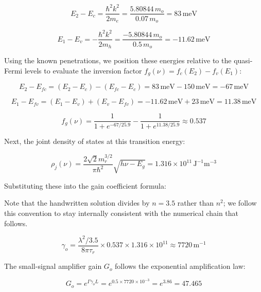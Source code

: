 \begin{equation*}
  E_2 - E_c = \frac{\hbar^2 k^2}{2 m_e} = \frac{5.80844\,m_o}{0.07\,m_o} = 83\,\text{meV}
\end{equation*}

\begin{equation*}
  E_1 - E_v = -\frac{\hbar^2 k^2}{2 m_h} = \frac{-5.80844\,m_o}{0.5\,m_o} = -11.62\,\text{meV}
\end{equation*}

Using the known penetrations, we position these energies relative to the quasi-Fermi levels to evaluate the inversion factor $f_g(\nu) = f_c(E_2) - f_v(E_1)$:

\begin{equation*}
  E_2 - E_{fc} = (E_2 - E_c) - (E_{fc} - E_c) = 83\,\text{meV} - 150\,\text{meV} = -67\,\text{meV}
\end{equation*}

\begin{equation*}
  E_1 - E_{fv} = (E_1 - E_v) + (E_v - E_{fv}) = -11.62\,\text{meV} + 23\,\text{meV} = 11.38\,\text{meV}
\end{equation*}

\begin{equation*}
  f_g(\nu) = \frac{1}{1 + e^{-67/25.9}} - \frac{1}{1 + e^{11.38/25.9}} \approx 0.537
\end{equation*}

Next, the joint density of states at this transition energy:

\begin{equation*}
  \rho_j(\nu) = \frac{2\sqrt{2} m_r^{3/2}}{\pi \hbar^2} \sqrt{h\nu - E_g} = 1.316 \times 10^{11}\,\text{J}^{-1}\text{m}^{-3}
\end{equation*}

Substituting these into the gain coefficient formula:

Note that the handwritten solution divides by $n = 3.5$ rather than $n^2$; we follow this convention to stay internally consistent with the numerical chain that follows.

\begin{equation*}
  \gamma_o = \frac{\lambda^2 / 3.5}{8\pi \tau_r} \times 0.537 \times 1.316 \times 10^{11} \approx 7720\,\text{m}^{-1}
\end{equation*}

The small-signal amplifier gain $G_o$ follows the exponential amplification law:

\begin{equation*}
  G_o = e^{\Gamma \gamma_o L} = e^{0.5 \times 7720 \times 10^{-3}} = e^{3.86} = 47.465
\end{equation*}

